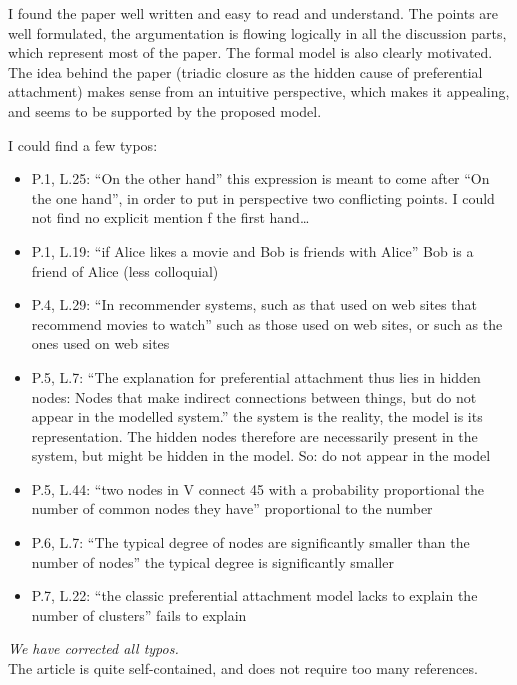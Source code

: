 \documentclass{article}
\begin{document}
 
I found the paper well written and easy to read and understand. The points are well formulated, the argumentation is flowing logically in all the discussion parts, which represent most of the paper. The formal model is also clearly motivated. The idea behind the paper (triadic closure as the hidden cause of preferential attachment) makes sense from an intuitive perspective, which makes it appealing, and seems to be supported by the proposed model.

I could find a few typos:
\begin{itemize}
\item P.1, L.25: ``On the other hand'' \textrightarrow{} this expression is meant to come after ``On the one hand'', in order to put in perspective two conflicting points. I could not find no explicit mention f the first hand…
\item P.1, L.19: ``if Alice likes a movie and Bob is friends with Alice'' \textrightarrow{} Bob is a friend of Alice (less colloquial)
\item P.4, L.29: ``In recommender systems, such as that used on web sites that recommend movies to watch'' \textrightarrow{} such as those used on web sites, or such as the ones used on web sites
\item P.5, L.7: ``The explanation for preferential attachment thus lies in hidden nodes: Nodes that make indirect connections between things, but do not appear in the modelled system.'' \textrightarrow{} the system is the reality, the model is its representation. The hidden nodes therefore are necessarily present in the system, but might be hidden in the model. So: \textrightarrow{} do not appear in the model
\item P.5, L.44: ``two nodes in V connect 45 with a probability proportional the number of common nodes they have'' \textrightarrow{} proportional to the number
\item P.6, L.7: ``The typical degree of nodes are significantly smaller than the number of nodes'' \textrightarrow{} the typical degree is significantly smaller
\item P.7, L.22: ``the classic preferential attachment model lacks to explain the number of clusters'' \textrightarrow{} fails to explain
\end{itemize}

\textit{We have corrected all typos.} \\
 
The article is quite self-contained, and does not require too many references.
\end{document}
